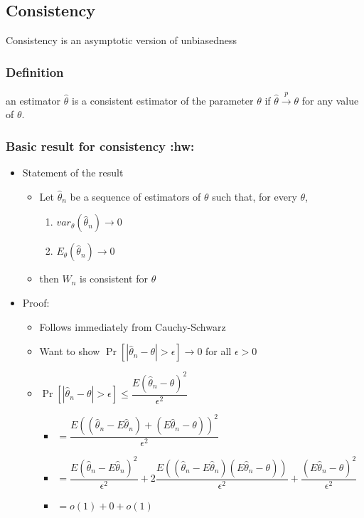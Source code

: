 \documentclass[11pt]{article}
\begin{document}
\subsection{Consistency}
\label{sec-1-6}

     Consistency is an asymptotic version of unbiasedness
\subsubsection{Definition}
\label{sec-1-6-1}

      an estimator $\hat \theta$ is a consistent estimator of the
      parameter $\theta$ if $\hat \theta \xrightarrow{p} \theta$ for
      any value of $\theta$.
\subsubsection{Basic result for consistency \textbf{:hw:}}
\label{sec-1-6-2}

\begin{itemize}
\item Statement of the result
\begin{itemize}
\item Let $\hat\theta_n$ be a sequence of estimators of $\theta$ such
          that, for every $\theta$,
\begin{enumerate}
\item $var_\theta(\hat\theta_n) \to 0$
\item $E_\theta (\hat\theta_n) \to 0$
\end{enumerate}
\item then $W_n$ is consistent for $\theta$
\end{itemize}
\item Proof:
\begin{itemize}
\item Follows immediately from Cauchy-Schwarz
\item Want to show $\Pr[|\hat \theta_n - \theta| > \epsilon] \to 0$ for all $\epsilon > 0$
\item $\Pr[|\hat \theta_n - \theta| > \epsilon] \leq \dfrac{E(\hat\theta_n - \theta)^2}{\epsilon^2}$
\begin{itemize}
\item $= \dfrac{E((\hat\theta_n - E\hat\theta_n)+ (E\hat\theta_n - \theta))^2}{\epsilon^2}$
\item $= \dfrac{E(\hat\theta_n - E\hat\theta_n)^2}{\epsilon^2} + 2 \dfrac{E((\hat\theta_n - E\hat\theta_n)(E\hat\theta_n - \theta))}{\epsilon^2} + \dfrac{(E\hat\theta_n - \theta)^2}{\epsilon^2}$
\item $= o(1) + 0 + o(1)$
\end{itemize}
\end{itemize}
\end{itemize}
\end{document}
